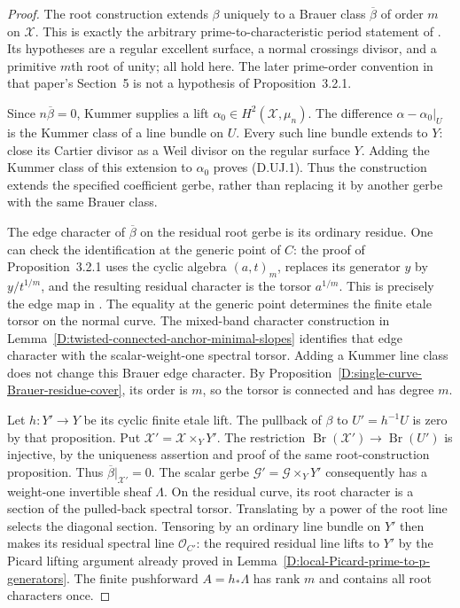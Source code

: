 \begin{proof}
The root construction extends $\beta$ uniquely to a Brauer
class $\overline\beta$ of order $m$ on $\mathcal X$.
This is exactly the arbitrary prime-to-characteristic period
statement of \citet[Proposition~3.2.1 and complete proof,
pp.~10--11]{Lieblich2011ResidualD}. Its hypotheses are a
regular excellent surface, a normal crossings divisor, and
a primitive $m$th root of unity; all hold here. The later
prime-order convention in that paper's Section~5 is not a
hypothesis of Proposition~3.2.1.

Since $n\overline\beta=0$, Kummer supplies a lift
$\alpha_0\in H^2(\mathcal X,\mu_n)$. The difference
$\alpha-\alpha_0|_U$ is the Kummer class of a line bundle on
$U$. Every such line bundle extends to $Y$: close its Cartier
divisor as a Weil divisor on the regular surface $Y$.
Adding the Kummer class of this extension to $\alpha_0$
proves (D.UJ.1). Thus the construction extends the specified
coefficient gerbe, rather than replacing it by another gerbe
with the same Brauer class.

The edge character of $\overline\beta$ on the residual
root gerbe is its ordinary residue. One can check the
identification at the generic point of $C$: the proof of
Proposition~3.2.1 uses the cyclic algebra $(a,t)_m$, replaces
its generator $y$ by $y/t^{1/m}$, and the resulting residual
character is the torsor $a^{1/m}$. This is precisely the edge
map in \citet[Proposition~4.1.4 and complete proof,
p.~11]{Lieblich2011ResidualD}. The equality at the generic
point determines the finite etale torsor on the normal curve.
The mixed-band character construction in
Lemma~\ref{D:twisted-connected-anchor-minimal-slopes}
identifies that edge character with the scalar-weight-one
spectral torsor. Adding a Kummer line class does not change
this Brauer edge character. By
Proposition~\ref{D:single-curve-Brauer-residue-cover}, its
order is $m$, so the torsor is connected and has degree $m$.

Let $h:Y'\to Y$ be its cyclic finite etale lift. The pullback
of $\beta$ to $U'=h^{-1}U$ is zero by that proposition.
Put $\mathcal X'=\mathcal X\times_Y Y'$. The restriction
$\operatorname{Br}(\mathcal X')\to\operatorname{Br}(U')$
is injective, by the uniqueness assertion and proof of the
same root-construction proposition. Thus
$\overline\beta|_{\mathcal X'}=0$. The scalar gerbe
$\mathcal G'=\mathcal G\times_Y Y'$ consequently has a
weight-one invertible sheaf $\Lambda$. On the residual
curve, its root character is a section of the pulled-back
spectral torsor. Translating by a power of the root line
selects the diagonal section. Tensoring by an ordinary
line bundle on $Y'$ then makes its residual spectral line
$\mathcal O_{C'}$: the required residual line lifts to
$Y'$ by the Picard lifting argument already proved in
Lemma~\ref{D:local-Picard-prime-to-p-generators}.
The finite pushforward $A=h_*\Lambda$ has rank $m$ and
contains all root characters once.


\end{proof}
